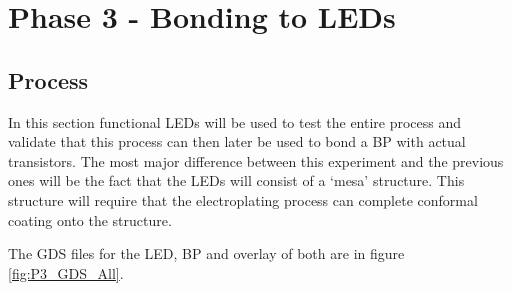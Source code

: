 \chapter{Phase 3 - Bonding to LEDs}
\label{sec:BondingToLEDS}
\section{Process}
In this section functional LEDs will be used to test the entire process and validate that this process can then later be used to bond a BP with actual transistors. The most major difference between this experiment and the previous ones will be the fact that the LEDs will consist of a `mesa' structure. This structure will require that the electroplating process can complete conformal coating onto the structure.

The GDS files for the LED, BP and overlay of both are in figure \ref{fig:P3_GDS_All}.

